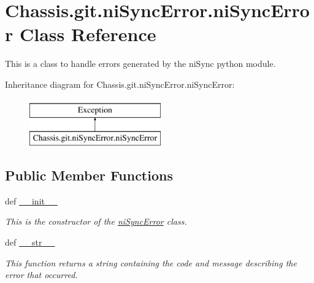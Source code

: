 \hypertarget{class_chassis_8git_1_1ni_sync_error_1_1ni_sync_error}{\section{Chassis.\-git.\-ni\-Sync\-Error.\-ni\-Sync\-Error Class Reference}
\label{class_chassis_8git_1_1ni_sync_error_1_1ni_sync_error}
}


This is a class to handle errors generated by the ni\-Sync python module.  


Inheritance diagram for Chassis.\-git.\-ni\-Sync\-Error.\-ni\-Sync\-Error\-:\begin{figure}[H]
\begin{center}
\leavevmode
\includegraphics[height=2.000000cm]{class_chassis_8git_1_1ni_sync_error_1_1ni_sync_error}
\end{center}
\end{figure}
\subsection*{Public Member Functions}
\begin{DoxyCompactItemize}
\item 
def \hyperlink{class_chassis_8git_1_1ni_sync_error_1_1ni_sync_error_a8883f4a6b770e849b6150f42cbd52e31}{\-\_\-\-\_\-init\-\_\-\-\_\-}
\begin{DoxyCompactList}\small\item\em This is the constructor of the \hyperlink{class_chassis_8git_1_1ni_sync_error_1_1ni_sync_error}{ni\-Sync\-Error} class. \end{DoxyCompactList}\item 
def \hyperlink{class_chassis_8git_1_1ni_sync_error_1_1ni_sync_error_a83e3cac4a7f6d7f543f748a55a10c28f}{\-\_\-\-\_\-str\-\_\-\-\_\-}
\begin{DoxyCompactList}\small\item\em This function returns a string containing the code and message describing the error that occurred. \end{DoxyCompactList}\end{DoxyCompactItemize}
